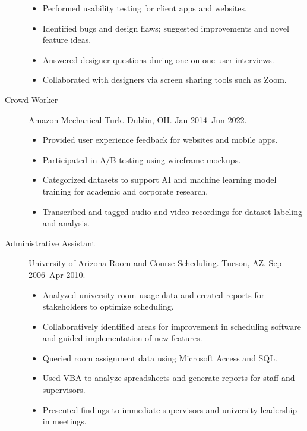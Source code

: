 \documentclass{article}
\begin{document}
\begin{description}
\begin{itemize}
  \item Performed usability testing for client apps and websites.
  \item Identified bugs and design flaws; suggested improvements and novel feature ideas.
  \item Answered designer questions during one-on-one user interviews.
  \item Collaborated with designers via screen sharing tools such as Zoom.
\end{itemize}
\item[Crowd Worker] Amazon Mechanical Turk. Dublin, OH. Jan 2014–Jun 2022.
\begin{itemize}
  \item Provided user experience feedback for websites and mobile apps.
  \item Participated in A/B testing using wireframe mockups.
  \item Categorized datasets to support AI and machine learning model training for academic and corporate research.
  \item Transcribed and tagged audio and video recordings for dataset labeling and analysis.
\end{itemize}
\item[Administrative Assistant] University of Arizona Room and Course Scheduling. Tucson, AZ. Sep 2006–Apr 2010.
\begin{itemize}
  \item Analyzed university room usage data and created reports for stakeholders to optimize scheduling.
  \item Collaboratively identified areas for improvement in scheduling software and guided implementation of new features.
  \item Queried room assignment data using Microsoft Access and SQL.
  \item Used VBA to analyze spreadsheets and generate reports for staff and supervisors.
  \item Presented findings to immediate supervisors and university leadership in meetings.
\end{itemize}
\end{description}


\vspace{-1em}
\end{document}
